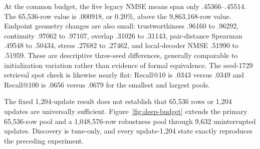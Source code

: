 \documentclass[10pt]{article}
\begin{document}
\begin{table}[H]
\centering
\scriptsize
\setlength{\tabcolsep}{3.2pt}
\caption{Deep1B training-pool control; entries are mean$\pm$sample standard deviation
over three paired initialization seeds.  Every fixed-budget arm sees exactly 9,863,168
row presentations.  The tune columns share one cohort; legacy evaluation occurs only
after tune-only checkpoint selection.  The one-pass column deliberately varies both
distinct rows and update count.}
\label{tab:deep-pool-control}
\end{table}

At the common budget, the five legacy NMSE means span only .45366--.45514.  The
65,536-row value is .000918, or 0.20\%, above the 9,863,168-row value.  Endpoint geometry
changes are also small: trustworthiness .96160 to .96292, continuity .97062 to .97107,
overlap .31026 to .31143, pair-distance Spearman .49548 to .50434, stress .27682 to
.27462, and local-decoder NMSE .51990 to .51959.  These are descriptive three-seed
differences, generally comparable to initialization variation rather than evidence of
formal equivalence.  The seed-1729 retrieval spot check is likewise nearly flat:
Recall@10 is .0343 versus .0349 and Recall@100 is .0656 versus .0679 for the smallest
and largest pools.

The fixed 1,204-update result does not establish that 65,536 rows or 1,204 updates are
universally sufficient.  Figure~\ref{fig:deep-budget} extends the primary 65,536-row pool
and a 1,048,576-row robustness pool through 9,632 uninterrupted updates.  Discovery is
tune-only, and every update-1,204 state exactly reproduces the preceding experiment.
\end{document}
